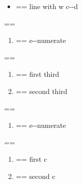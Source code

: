 \documentclass{book}
\makeatletter
\newenvironment{Texinfopreformatted}{%
  \par\GNUTobeylines\obeyspaces\frenchspacing\parskip=\z@\parindent=\z@}{}
{\catcode`\^^M=13 \gdef\GNUTobeylines{\catcode`\^^M=13 \def^^M{\null\par}}}
\newenvironment{Texinfoindented}{\begin{list}{}{}\item\relax}{\end{list}}
\renewcommand{\_}{\Texinfounderscore\discretionary{}{}{}}
\makeatother
\begin{document}
\begin{Texinfoindented}
\begin{itemize}[label=\hbox{} on a line]
\begin{Texinfopreformatted}
\end{Texinfopreformatted}
\item \begin{Texinfopreformatted}%
\ttfamily line with w c{-}{-}d
\end{Texinfopreformatted}
\end{itemize}
\begin{Texinfopreformatted}%
\ttfamily 
\end{Texinfopreformatted}
\begin{enumerate}[start=1]
\item \begin{Texinfopreformatted}%
\ttfamily e{-}{-}numerate
\end{Texinfopreformatted}
\end{enumerate}
\begin{Texinfopreformatted}%
\ttfamily 
\end{Texinfopreformatted}
\begin{enumerate}[start=3]
\item \begin{Texinfopreformatted}%
\ttfamily first third
\end{Texinfopreformatted}
\item \begin{Texinfopreformatted}%
\ttfamily second third
\end{Texinfopreformatted}
\end{enumerate}
\begin{Texinfopreformatted}%
\ttfamily 
\end{Texinfopreformatted}
\begin{enumerate}[label=\alph*.]
\item \begin{Texinfopreformatted}%
\ttfamily e{-}{-}numerate
\end{Texinfopreformatted}
\end{enumerate}
\begin{Texinfopreformatted}%
\ttfamily 
\end{Texinfopreformatted}
\begin{enumerate}[label=\alph*.,start=3]
\item \begin{Texinfopreformatted}%
\ttfamily first c
\end{Texinfopreformatted}
\item \begin{Texinfopreformatted}%
\ttfamily second c
\end{Texinfopreformatted}
\end{enumerate}

\end{Texinfoindented}
\end{document}

